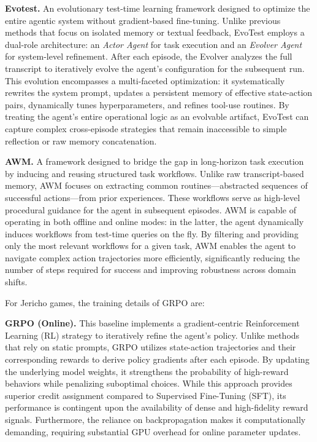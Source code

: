 \textbf{Evotest.} \citep{evotest} An evolutionary test-time learning framework designed to optimize the entire agentic system without gradient-based fine-tuning. Unlike previous methods that focus on isolated memory or textual feedback, EvoTest employs a dual-role architecture: an \textit{Actor Agent} for task execution and an \textit{Evolver Agent} for system-level refinement. After each episode, the Evolver analyzes the full transcript to iteratively evolve the agent’s configuration for the subsequent run. This evolution encompasses a multi-faceted optimization: it systematically rewrites the system prompt, updates a persistent memory of effective state-action pairs, dynamically tunes hyperparameters, and refines tool-use routines. By treating the agent’s entire operational logic as an evolvable artifact, EvoTest can capture complex cross-episode strategies that remain inaccessible to simple reflection or raw memory concatenation.

\textbf{AWM.} \citep{awm} A framework designed to bridge the gap in long-horizon task execution by inducing and reusing structured task workflows. Unlike raw transcript-based memory, AWM focuses on extracting common routines—abstracted sequences of successful actions—from prior experiences. These workflows serve as high-level procedural guidance for the agent in subsequent episodes. AWM is capable of operating in both offline and online modes: in the latter, the agent dynamically induces workflows from test-time queries on the fly. By filtering and providing only the most relevant workflows for a given task, AWM enables the agent to navigate complex action trajectories more efficiently, significantly reducing the number of steps required for success and improving robustness across domain shifts.

For Jericho games, the training details of GRPO are:

\textbf{GRPO (Online).} \citep{grpo} This baseline implements a gradient-centric Reinforcement Learning (RL) strategy to iteratively refine the agent's policy. Unlike methods that rely on static prompts, GRPO utilizes state-action trajectories and their corresponding rewards to derive policy gradients after each episode. By updating the underlying model weights, it strengthens the probability of high-reward behaviors while penalizing suboptimal choices. While this approach provides superior credit assignment compared to Supervised Fine-Tuning (SFT), its performance is contingent upon the availability of dense and high-fidelity reward signals. Furthermore, the reliance on backpropagation makes it computationally demanding, requiring substantial GPU overhead for online parameter updates.


